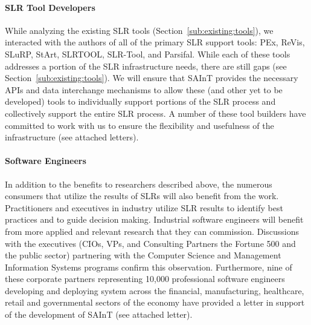 \paragraph{SLR Tool Developers}
While analyzing the existing SLR tools (Section~\ref{sub:existing:tools}), we interacted with the authors of all of the primary SLR support tools: PEx, ReVis, SLuRP, StArt, SLRTOOL, SLR-Tool, and Parsifal.
While each of these tools addresses a portion of the SLR infrastructure needs, there are still gaps (see Section~\ref{sub:existing:tools}).
We will ensure that SAInT provides the necessary APIs and data interchange mechanisms to allow these (and other yet to be developed) tools to individually support portions of the SLR process and collectively support the entire SLR process.
A number of these tool builders have committed to work with us to ensure the flexibility and usefulness of the infrastructure (see attached letters).

\paragraph{Software Engineers} 
In addition to the benefits to researchers described above, the numerous consumers that utilize the results of SLRs will also benefit from the work.  
Practitioners and executives in industry utilize SLR results to identify best practices and to guide decision making.  
Industrial software engineers will benefit from more applied and relevant research that they can commission.
Discussions with the executives (CIOs, VPs, and Consulting Partners the Fortune 500 and the public sector) partnering with the Computer Science and Management Information Systems programs confirm this observation.   
Furthermore, nine of these corporate partners representing 10,000 professional software engineers developing and deploying system across the financial, manufacturing, healthcare, retail and governmental sectors of the economy have provided a letter in support of the development of SAInT (see attached letter).